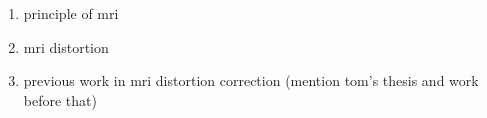 \begin{enumerate}
  \item principle of mri
  \item mri distortion
  \item previous work in mri distortion correction (mention tom's thesis and work before that)
\end{enumerate}
